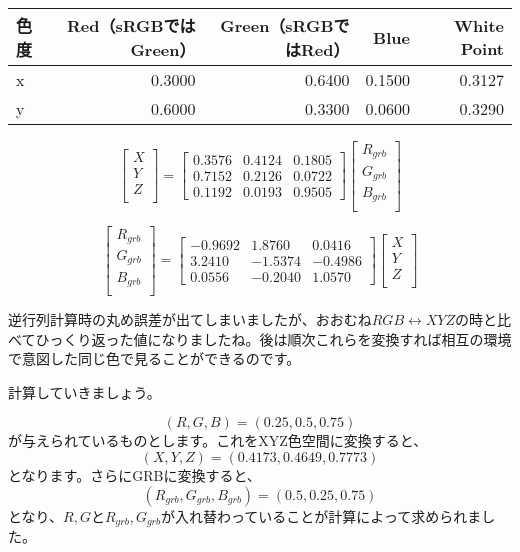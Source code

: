 \documentclass[12pt]{jsarticle}
\begin{document}
\begin{center}
\begin{tabular}{|l|r|r|r|r|} \hline
色度 & Red（sRGBではGreen） & Green（sRGBではRed） & Blue & White Point \\ \hline
x & 0.3000 & 0.6400 & 0.1500 & 0.3127 \\ \hline
y & 0.6000 & 0.3300 & 0.0600 & 0.3290 \\ \hline
\end{tabular}
\end{center}

\[
\begin{bmatrix}
X \\
Y \\
Z \\
\end{bmatrix}
=
\begin{bmatrix}
0.3576 & 0.4124 & 0.1805 \\
0.7152 & 0.2126 & 0.0722 \\
0.1192 & 0.0193 & 0.9505
\end{bmatrix}
\begin{bmatrix}
R_{grb} \\
G_{grb} \\
B_{grb} \\
\end{bmatrix}
\]

\[
\begin{bmatrix}
R_{grb} \\
G_{grb} \\
B_{grb} \\
\end{bmatrix}
=
\begin{bmatrix}
-0.9692 & 1.8760 & 0.0416 \\
3.2410 & -1.5374 & -0.4986 \\
0.0556 & -0.2040 & 1.0570
\end{bmatrix}
\begin{bmatrix}
X \\
Y \\
Z \\
\end{bmatrix}
\]

逆行列計算時の丸め誤差が出てしまいましたが、おおむね$RGB \leftrightarrow XYZ$の時と比べてひっくり返った値になりましたね。後は順次これらを変換すれば相互の環境で意図した同じ色で見ることができるのです。

計算していきましょう。

\[
(R,G,B) = (0.25, 0.5, 0.75)
\]
が与えられているものとします。これをXYZ色空間に変換すると、
\[
(X,Y,Z) = (0.4173, 0.4649, 0.7773)
\]
となります。さらにGRBに変換すると、
\[
(R_{grb},G_{grb},B_{grb}) = (0.5, 0.25, 0.75)
\]
となり、$R,G$と$R_{grb},G_{grb}$が入れ替わっていることが計算によって求められました。
\end{document}
